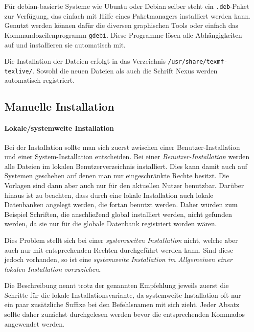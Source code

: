 Für debian-basierte Systeme wie Ubuntu oder Debian selber steht ein
\texttt{.deb}-Paket zur Verfügung, das einfach mit Hilfe eines Paketmanagers
installiert werden kann.
Genutzt werden können dafür die diversen graphischen Tools oder einfach das
Kommandozeilenprogramm \texttt{gdebi}. Diese Programme lösen alle Abhängigkeiten
auf und installieren sie automatisch mit.

Die Installation der Dateien erfolgt in das Verzeichnis
\lstinline{/usr/share/texmf-texlive/}. Sowohl die neuen Dateien als auch 
die Schrift Nexus werden automatisch registriert.

\subsection{Manuelle Installation}

\paragraph{Lokale/systemweite Installation}

Bei der Installation sollte man sich zuerst zwischen einer Benutzer-Installation
und einer System-Installation entscheiden.
Bei einer \emph{Benutzer-Installation} werden alle Dateien im lokalen Benutzerverzeichnis installiert.
Dies kann damit auch auf Systemen geschehen auf denen man nur
eingeschränkte Rechte besitzt.
Die Vorlagen sind dann aber auch nur für den aktuellen Nutzer benutzbar.
Darüber hinaus ist zu beachten, dass durch eine lokale Installation auch
lokale Datenbanken angelegt werden, die fortan benutzt werden.
Daher würden zum Beispiel Schriften, die anschließend global installiert werden,
nicht gefunden werden, da sie nur für die globale Datenbank registriert worden wären.

Dies Problem stellt sich bei einer \emph{systemweiten Installation} nicht,
welche aber auch nur mit entsprechenden Rechten durchgeführt werden kann.
Sind diese jedoch vorhanden, so ist eine \emph{systemweite Installation im
Allgemeinen einer lokalen Installation vorzuziehen}.

\begin{important}
Die Beschreibung nennt trotz der genannten Empfehlung jeweils zuerst die
Schritte für die lokale Installationsvariante, da systemweite Installation
oft nur ein paar zusätzliche Suffixe bei den Befehlsnamen mit sich zieht.
Jeder Absatz sollte daher zunächst durchgelesen werden bevor die entsprechenden
Kommados angewendet werden.
\end{important}



